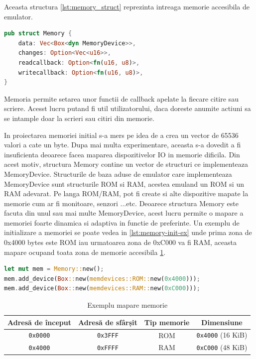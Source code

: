 \documentclass[titlepage,12pt]{article}
\DeclareRobustCommand{\code}[1]{{\ttfamily\small #1}}
\begin{document}
Aceasta structura \cref{lst:memory_struct} reprezinta intreaga memorie accesibila de emulator.

\begin{lstlisting}[language=Rust,caption={Structura Memorie},label={lst:memory_struct}]
pub struct Memory {
    data: Vec<Box<dyn MemoryDevice>>,
    changes: Option<Vec<u16>>,
    readcallback: Option<fn(u16, u8)>,
    writecallback: Option<fn(u16, u8)>,
}
\end{lstlisting}

Memoria permite setarea unor functii de callback apelate la fiecare citire sau scriere. Acesst lucru putand fi util utilizatorului, daca doreste anumite actiuni sa se intample doar la scrieri sau citiri din memorie.

In proiectarea memoriei initial s-a mers pe idea de a crea un vector de 65536 valori a cate un byte. Dupa mai multa experimentare, aceasta s-a dovedit a fi insuficienta deoarece facea maparea dispozitivelor \code{IO} in memorie dificila. Din acest motiv, structura Memory contine un vector de structuri ce implementeaza \code{MemoryDevice}.
Structurile de baza aduse de emulator care implementeaza \code{MemoryDevice} sunt structurile \code{ROM} si \code{RAM}, acestea emuland un ROM si un RAM adevarat. Pe langa ROM/RAM, pot fi create si alte dispozitive mapate la memorie cum ar fi monitoare, senzori ...etc.
Deoarece structura \code{Memory} este facuta din unul sau mai multe \code{MemoryDevice}, acest lucru permite o mapare a memoriei foarte dinamica si adaptiva in functie de preferinte. Un exemplu de initializare a memoriei se poate vedea in \cref{lst:memory-init-ex} unde prima zona de 0x4000 bytes este ROM iau urmatoarea zona de 0xC000 va fi RAM, aceasta mapare ocupand toata zona de memorie accesibila \cref{tab:memory-mapping-ex}.
\begin{lstlisting}[language=Rust,caption={Exemplu initializare memorie},label={lst:memory-init-ex}]
let mut mem = Memory::new();
mem.add_device(Box::new(memdevices::ROM::new(0x4000)));
mem.add_device(Box::new(memdevices::RAM::new(0xC000)));
\end{lstlisting}

\begin{table}[H]
\centering
\begin{tabular}{|c|c|c|c|}
\hline
\textbf{Adresă de început} & \textbf{Adresă de sfârșit} & \textbf{Tip memorie} & \textbf{Dimensiune} \\
\hline
\texttt{0x0000} & \texttt{0x3FFF} & ROM & \texttt{0x4000} (16 KiB) \\
\hline
\texttt{0x4000} & \texttt{0xFFFF} & RAM & \texttt{0xC000} (48 KiB) \\
\hline
\end{tabular}
\caption{Exemplu mapare memorie}
\label{tab:memory-mapping-ex}
\end{table}
\end{document}
